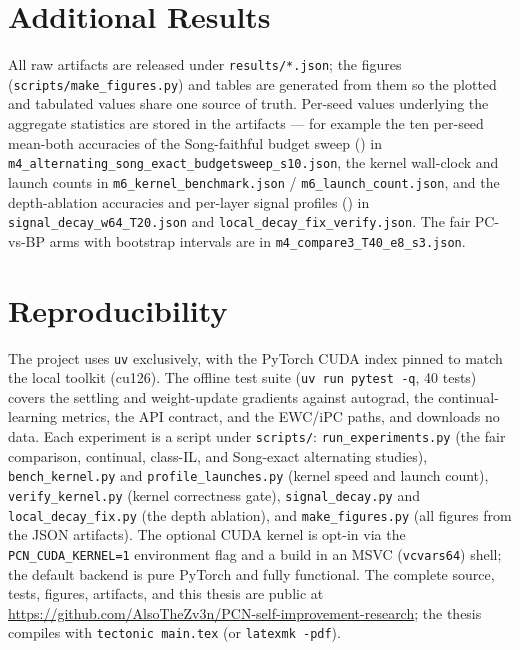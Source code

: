 \section{Additional Results}\label{app:results}

All raw artifacts are released under \texttt{results/*.json}; the figures
(\texttt{scripts/make\_figures.py}) and tables are generated from them so the plotted and tabulated
values share one source of truth. Per-seed values underlying the aggregate statistics are stored in
the artifacts --- for example the ten per-seed mean-both accuracies of the Song-faithful budget
sweep () in \texttt{m4\_alternating\_song\_exact\_budgetsweep\_s10.json}, the
kernel wall-clock and launch counts in \texttt{m6\_kernel\_benchmark.json} /
\texttt{m6\_launch\_count.json}, and the depth-ablation accuracies and per-layer signal profiles
() in \texttt{signal\_decay\_w64\_T20.json} and
\texttt{local\_decay\_fix\_verify.json}. The fair PC-vs-BP arms with bootstrap intervals are in
\texttt{m4\_compare3\_T40\_e8\_s3.json}.

\section{Reproducibility}\label{app:repro}

The project uses \texttt{uv} exclusively, with the PyTorch CUDA index pinned to match the local
toolkit (cu126). The offline test suite (\texttt{uv run pytest -q}, 40 tests) covers the settling
and weight-update gradients against autograd, the continual-learning metrics, the API contract, and
the EWC/iPC paths, and downloads no data. Each experiment is a script under \texttt{scripts/}:
\texttt{run\_experiments.py} (the fair comparison, continual, class-IL, and Song-exact alternating
studies), \texttt{bench\_kernel.py} and \texttt{profile\_launches.py} (kernel speed and launch
count), \texttt{verify\_kernel.py} (kernel correctness gate), \texttt{signal\_decay.py} and
\texttt{local\_decay\_fix.py} (the depth ablation), and \texttt{make\_figures.py} (all figures from
the JSON artifacts). The optional CUDA kernel is opt-in via the \texttt{PCN\_CUDA\_KERNEL=1}
environment flag and a build in an MSVC (\texttt{vcvars64}) shell; the default backend is pure
PyTorch and fully functional. The complete source, tests, figures, artifacts, and this thesis are
public at \url{https://github.com/AlsoTheZv3n/PCN-self-improvement-research}; the thesis compiles
with \texttt{tectonic main.tex} (or \texttt{latexmk -pdf}).
